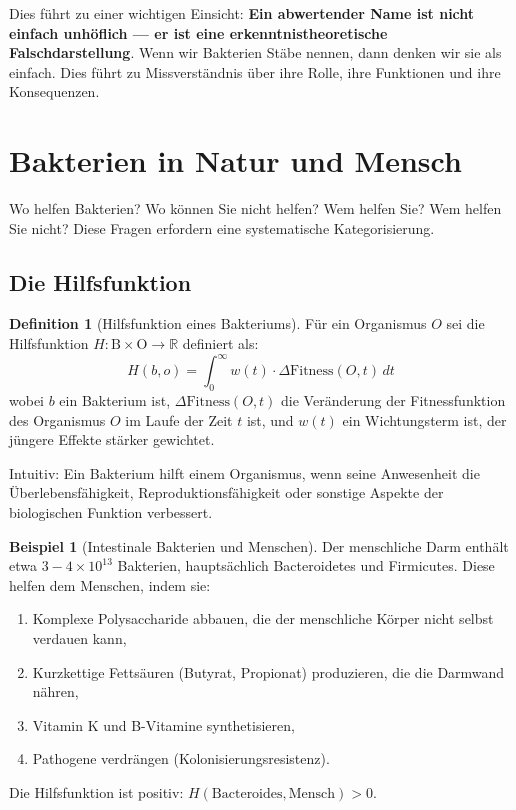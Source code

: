\documentclass[a4paper,12pt]{article}
\theoremstyle{definition}
\newtheorem{definition}{Definition}
\newtheorem{beispiel}{Beispiel}
\begin{document}
Dies führt zu einer wichtigen Einsicht: \textbf{Ein abwertender Name ist nicht einfach unhöflich --- er ist eine erkenntnistheoretische Falschdarstellung}. Wenn wir Bakterien Stäbe nennen, dann denken wir sie als einfach. Dies führt zu Missverständnis über ihre Rolle, ihre Funktionen und ihre Konsequenzen.

\section{Bakterien in Natur und Mensch}

Wo helfen Bakterien? Wo können Sie nicht helfen? Wem helfen Sie? Wem helfen Sie nicht? Diese Fragen erfordern eine systematische Kategorisierung.

\subsection{Die Hilfsfunktion}

\begin{definition}[Hilfsfunktion eines Bakteriums]
Für ein Organismus $O$ sei die Hilfsfunktion $H: \text{B} \times \text{O} \to \mathbb{R}$ definiert als:
\[
H(b, o) = \int_0^\infty w(t) \cdot \Delta \text{Fitness}(O, t) \, dt
\]
wobei $b$ ein Bakterium ist, $\Delta \text{Fitness}(O, t)$ die Veränderung der Fitnessfunktion des Organismus $O$ im Laufe der Zeit $t$ ist, und $w(t)$ ein Wichtungsterm ist, der jüngere Effekte stärker gewichtet.
\end{definition}

Intuitiv: Ein Bakterium hilft einem Organismus, wenn seine Anwesenheit die Überlebensfähigkeit, Reproduktionsfähigkeit oder sonstige Aspekte der biologischen Funktion verbessert.

\begin{beispiel}[Intestinale Bakterien und Menschen]
Der menschliche Darm enthält etwa $3-4 \times 10^{13}$ Bakterien, hauptsächlich Bacteroidetes und Firmicutes. Diese helfen dem Menschen, indem sie:
\begin{enumerate}
    \item Komplexe Polysaccharide abbauen, die der menschliche Körper nicht selbst verdauen kann,
    \item Kurzkettige Fettsäuren (Butyrat, Propionat) produzieren, die die Darmwand nähren,
    \item Vitamin K und B-Vitamine synthetisieren,
    \item Pathogene verdrängen (Kolonisierungsresistenz).
\end{enumerate}
Die Hilfsfunktion ist positiv: $H(\text{Bacteroides}, \text{Mensch}) > 0$.
\end{beispiel}
\end{document}
